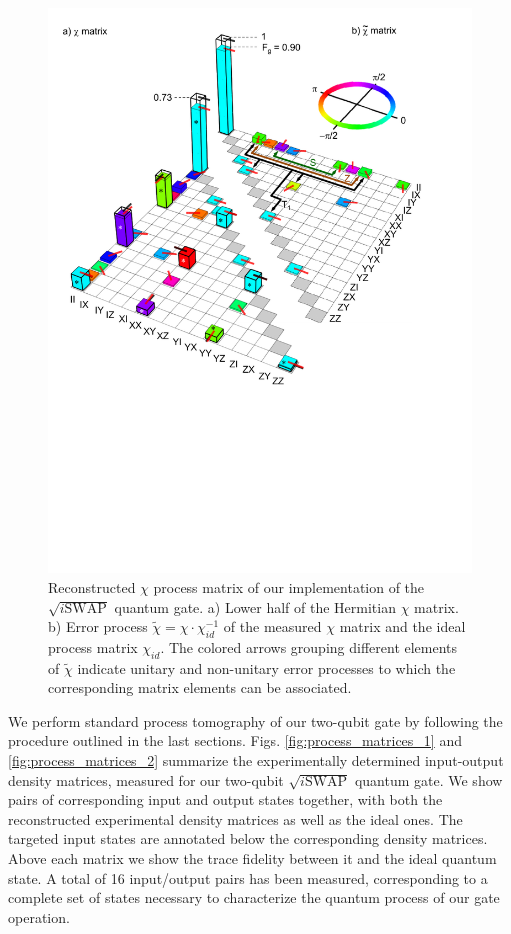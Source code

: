\begin{figure}[ht!]
	\centering
		\includegraphics[width=1.\textwidth]{./material/papers/iswap/figures/chi_matrix_and_error_process}
	\caption{Reconstructed $\chi$ process matrix of our implementation of the $\sqrt{i\mathrm{SWAP}}$ quantum gate. a) Lower half of the Hermitian $\chi$ matrix. b) Error process $\tilde{\chi}=\chi\cdot\chi_{id}^{-1}$ of the measured $\chi$ matrix and the ideal process matrix $\chi_{id}$. The colored arrows grouping different elements of $\tilde{\chi}$ indicate unitary and non-unitary error processes to which the corresponding matrix elements can be associated.}
	\label{fig:chi_matrix_and_errors}
\end{figure}

We perform standard process tomography of our two-qubit gate by following the procedure outlined in the last sections. Figs. \ref{fig:process_matrices_1} and \ref{fig:process_matrices_2} summarize the experimentally determined input-output density matrices, measured for our two-qubit $\sqrt{i\mathrm{SWAP}}$ quantum gate. We show pairs of corresponding input and output states together, with both the reconstructed experimental density matrices as well as the ideal ones. The targeted input states are annotated below the corresponding density matrices. Above each matrix we show the trace fidelity between it and the ideal quantum state. A total of 16 input/output pairs has been measured, corresponding to a complete set of states necessary to characterize the quantum process of our gate operation.

